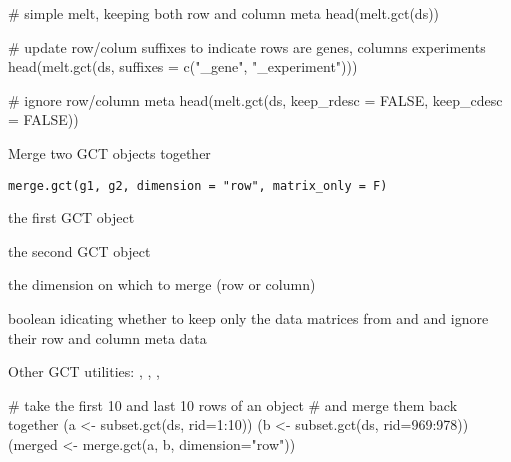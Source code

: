 \documentclass[letterpaper]{book}
\begin{document}
%
\begin{Examples}
\begin{ExampleCode}
# simple melt, keeping both row and column meta
head(melt.gct(ds))

# update row/colum suffixes to indicate rows are genes, columns experiments
head(melt.gct(ds, suffixes = c("_gene", "_experiment")))

# ignore row/column meta
head(melt.gct(ds, keep_rdesc = FALSE, keep_cdesc = FALSE))

\end{ExampleCode}
\end{Examples}
%
\begin{Description}\relax
Merge two GCT objects together
\end{Description}
%
\begin{Usage}
\begin{verbatim}
merge.gct(g1, g2, dimension = "row", matrix_only = F)
\end{verbatim}
\end{Usage}
%
\begin{Arguments}
\begin{ldescription}
\item[\code{g1}] the first GCT object

\item[\code{g2}] the second GCT object

\item[\code{dimension}] the dimension on which to merge (row or column)

\item[\code{matrix\_only}] boolean idicating whether to keep only the
data matrices from  and  and ignore their
row and column meta data
\end{ldescription}
\end{Arguments}
%
\begin{SeeAlso}\relax
Other GCT utilities: ,
, ,
\end{SeeAlso}
%
\begin{Examples}
\begin{ExampleCode}
# take the first 10 and last 10 rows of an object
# and merge them back together
(a <- subset.gct(ds, rid=1:10))
(b <- subset.gct(ds, rid=969:978))
(merged <- merge.gct(a, b, dimension="row"))

\end{ExampleCode}
\end{Examples}
\end{document}
